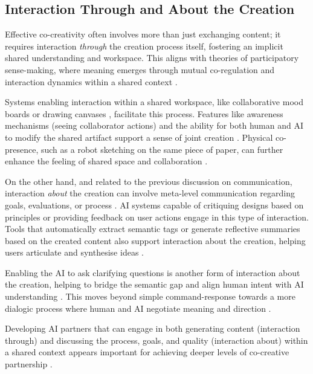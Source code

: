 \subsection{Interaction Through and About the Creation}

Effective co-creativity often involves more than just exchanging content; it requires interaction \textit{through} the creation process itself, fostering an implicit shared understanding and workspace. This aligns with theories of participatory sense-making, where meaning emerges through mutual co-regulation and interaction dynamics within a shared context \cite{Davis2016-te}.

Systems enabling interaction within a shared workspace, like collaborative mood boards \cite{Koch2020-gx} or drawing canvases \cite{Davis2016-te, Lawton2023-tb}, facilitate this process. Features like awareness mechanisms (seeing collaborator actions) \cite{Koch2020-gx} and the ability for both human and AI to modify the shared artifact support a sense of joint creation \cite{Lawton2023-tb}. Physical co-presence, such as a robot sketching on the same piece of paper, can further enhance the feeling of shared space and collaboration \cite{Lin2020-ji}.

On the other hand, and related to the previous discussion on communication, interaction \textit{about} the creation can involve meta-level communication regarding goals, evaluations, or process \cite{Rezwana2022-gg, Bown2020-oc}. AI systems capable of critiquing designs based on principles \cite{Zhou2024-vp} or providing feedback on user actions \cite{Davis2016-te} engage in this type of interaction. Tools that automatically extract semantic tags or generate reflective summaries based on the created content also support interaction about the creation, helping users articulate and synthesise ideas \cite{Koch2020-gx}.

Enabling the AI to ask clarifying questions is another form of interaction about the creation, helping to bridge the semantic gap and align human intent with AI understanding \cite{Bown2020-oc, Coenen2021-ym}. This moves beyond simple command-response towards a more dialogic process where human and AI negotiate meaning and direction \cite{Bown2020-oc, Lin2023-jd}.

Developing AI partners that can engage in both generating content (interaction through) and discussing the process, goals, and quality (interaction about) within a shared context appears important for achieving deeper levels of co-creative partnership \cite{Davis2016-te, Bown2020-oc, Zhou2024-vp}.

